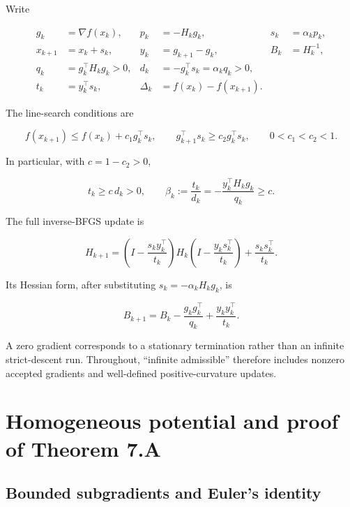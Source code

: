 Write

\[
\begin{aligned}
g_k&=\nabla f(x_k),&p_k&=-H_kg_k,&s_k&=\alpha_kp_k,\\
x_{k+1}&=x_k+s_k,&y_k&=g_{k+1}-g_k,&B_k&=H_k^{-1},\\
q_k&=g_k^\top H_kg_k>0,&d_k&=-g_k^\top s_k=\alpha_kq_k>0,\\
t_k&=y_k^\top s_k,&\Delta_k&=f(x_k)-f(x_{k+1}).
\end{aligned}
\]

The line-search conditions are

\[
f(x_{k+1})\le f(x_k)+c_1g_k^\top s_k,
\qquad
g_{k+1}^\top s_k\ge c_2g_k^\top s_k,
\qquad0<c_1<c_2<1.
\]

In particular, with \(c=1-c_2>0\),

\[
t_k\ge c\,d_k>0,
\qquad
\beta_k:=\frac{t_k}{d_k}
=-\frac{y_k^\top H_kg_k}{q_k}\ge c.
\]

The full inverse-BFGS update is

\[
H_{k+1}=
\left(I-\frac{s_ky_k^\top}{t_k}\right)
H_k
\left(I-\frac{y_ks_k^\top}{t_k}\right)
+\frac{s_ks_k^\top}{t_k}.
\]

Its Hessian form, after substituting \(s_k=-\alpha_kH_kg_k\), is

\[
\boxed{B_{k+1}=B_k-\frac{g_kg_k^\top}{q_k}
+\frac{y_ky_k^\top}{t_k}.}
\tag{7.2.1}
\]

A zero gradient corresponds to a stationary termination rather than an
infinite strict-descent run. Throughout, ``infinite admissible''
therefore includes nonzero accepted gradients and well-defined
positive-curvature updates.



\setcounter{section}{4}
\setcounter{theorem}{0}
\setcounter{lemma}{0}
\setcounter{corollary}{0}
\setcounter{proposition}{0}
\setcounter{remark}{0}
\setcounter{equation}{0}


\section{Homogeneous potential and proof of Theorem
7.A}\label{H:homogeneous-potential-and-proof-of-theorem-a}



\subsection{Bounded subgradients and Euler's
identity}\label{H:bounded-subgradients-and-eulers-identity}

